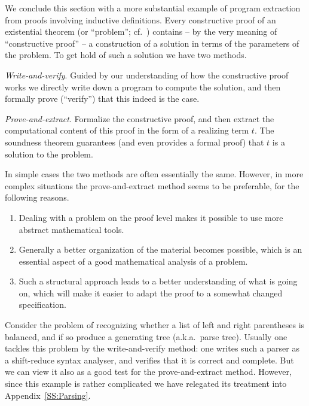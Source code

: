 \documentclass[12pt]{amsart}
\newcommand{\inquotes}[1]{``#1''}
\newenvironment{enumeratei}{\begin{enumerate}[\upshape (i)]}
                           {\end{enumerate}}
\begin{document}



We conclude this section with a more substantial example of program
extraction from proofs involving inductive definitions.  Every
constructive proof of an existential theorem (or \inquotes{problem};
cf.\ \cite{Kolmogorov32}) contains -- by the very meaning of
\inquotes{constructive proof} -- a construction of a solution in terms
of the parameters of the problem.  To get hold of such a solution we
have two methods.

\emph{Write-and-verify}.  Guided by our understanding of how the
constructive proof works we directly write down a program to compute
the solution, and then formally prove (\inquotes{verify}) that this
indeed is the case.

\emph{Prove-and-extract}.  Formalize the constructive proof, and then
extract the computational content of this proof in the form of a
realizing term $t$.  The soundness theorem guarantees (and even
provides a formal proof) that $t$ is a solution to the problem.

In simple cases the two methods are often essentially the same.
However, in more complex situations the prove-and-extract method seems
to be preferable, for the following reasons.
\begin{enumeratei}
\item Dealing with a problem on the proof level makes it possible to
  use more abstract mathematical tools.
\item Generally a better organization of the material becomes
  possible, which is an essential aspect of a good mathematical analysis
  of a problem.
\item Such a structural approach leads to a better understanding of
  what is going on, which will make it easier to adapt the proof to a
  somewhat changed specification.
\end{enumeratei}
Consider the problem of recognizing whether a list of left and right
parentheses is balanced, and if so produce a generating tree
(a.k.a.\ parse tree).  Usually one tackles this problem by the
write-and-verify method: one writes such a parser as a shift-reduce
syntax analyser, and verifies that it is correct and complete.  But we
can view it also as a good test for the prove-and-extract method.
However, since this example is rather complicated we have relegated
its treatment into Appendix~\ref{SS:Parsing}.
\end{document}
